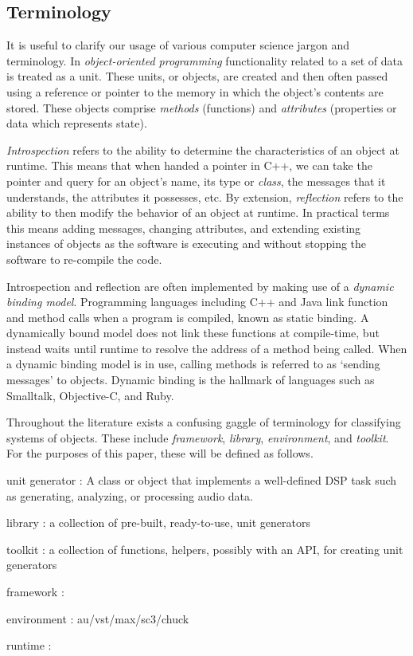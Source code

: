 \documentclass[twoside,10pt]{article}
\newenvironment{packed_item}{
\begin{itemize}
  \setlength{\itemsep}{1pt}
  \setlength{\parskip}{0pt}
  \setlength{\parsep}{0pt}
}{\end{itemize}}
\begin{document}
\subsection{Terminology}

It is useful to clarify our usage of various computer science jargon and terminology.  In \emph{object-oriented programming} functionality related to a set of data is treated as a unit.  These units, or objects, are created and then often passed using a reference or pointer to the memory in which the object's contents are stored.  These objects comprise \emph{methods} (functions) and \emph{attributes} (properties or data which represents state).

\emph{Introspection} refers to the ability to determine the characteristics of an object at runtime.  This means that when handed a pointer in C++, we can take the pointer and query for an object's name, its type or \emph{class}, the messages that it understands, the attributes it possesses, etc.  By extension, \emph{reflection} refers to the ability to then modify the behavior of an object at runtime.  In practical terms this means adding messages, changing attributes, and extending existing instances of objects as the software is executing and without stopping the software to re-compile the code.

Introspection and reflection are often implemented by making use of a \emph{dynamic binding model}.  Programming languages including C++ and Java link function and method calls when a program is compiled, known as static binding.  A dynamically bound model does not link these functions at compile-time, but instead waits until runtime to resolve the address of a method being called.  When a dynamic binding model is in use, calling methods is referred to as `sending messages' to objects.  Dynamic binding is the hallmark of languages such as Smalltalk, Objective-C, and Ruby.

Throughout the literature exists a confusing gaggle of terminology for classifying systems of objects.  These include \emph{framework}, \emph{library}, \emph{environment}, and \emph{toolkit}.  For the purposes of this paper, these will be defined as follows.  

\begin{packed_item}%
	\item unit generator : A class or object that implements a well-defined DSP task such as generating, analyzing, or processing audio data.
	\item library : a collection of pre-built, ready-to-use, unit generators
	\item toolkit	: a collection of functions, helpers, possibly with an API, for creating unit generators
	\item framework : 
	\item environment : au/vst/max/sc3/chuck
	\item runtime : 
\end{packed_item}%
\end{document}
